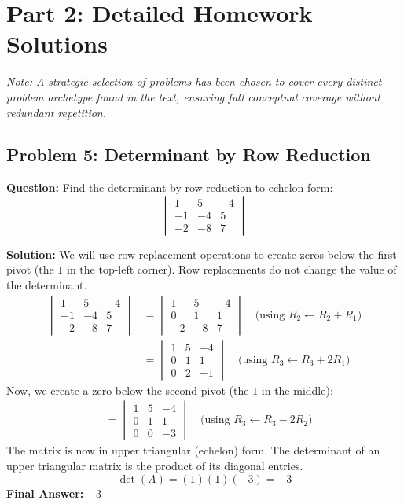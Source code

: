 \documentclass{article}
\begin{document}
\newpage
\section{Part 2: Detailed Homework Solutions}
\textit{Note: A strategic selection of problems has been chosen to cover every distinct problem archetype found in the text, ensuring full conceptual coverage without redundant repetition.}

\subsection{Problem 5: Determinant by Row Reduction}
\textbf{Question:} Find the determinant by row reduction to echelon form:
\[ \begin{vmatrix} 1 & 5 & -4 \\ -1 & -4 & 5 \\ -2 & -8 & 7 \end{vmatrix} \]

\textbf{Solution:}
We will use row replacement operations to create zeros below the first pivot (the $1$ in the top-left corner). Row replacements do not change the value of the determinant.
\begin{align*}
    \begin{vmatrix} 1 & 5 & -4 \\ -1 & -4 & 5 \\ -2 & -8 & 7 \end{vmatrix} 
    &= \begin{vmatrix} 1 & 5 & -4 \\ 0 & 1 & 1 \\ -2 & -8 & 7 \end{vmatrix} \quad \text{(using } R_2 \leftarrow R_2 + R_1 \text{)} \\
    &= \begin{vmatrix} 1 & 5 & -4 \\ 0 & 1 & 1 \\ 0 & 2 & -1 \end{vmatrix} \quad \text{(using } R_3 \leftarrow R_3 + 2R_1 \text{)}
\end{align*}
Now, we create a zero below the second pivot (the $1$ in the middle):
\begin{align*}
    &= \begin{vmatrix} 1 & 5 & -4 \\ 0 & 1 & 1 \\ 0 & 0 & -3 \end{vmatrix} \quad \text{(using } R_3 \leftarrow R_3 - 2R_2 \text{)}
\end{align*}
The matrix is now in upper triangular (echelon) form. The determinant of an upper triangular matrix is the product of its diagonal entries.
\[ \det(A) = (1)(1)(-3) = -3 \]
\textbf{Final Answer:} $-3$
\end{document}
